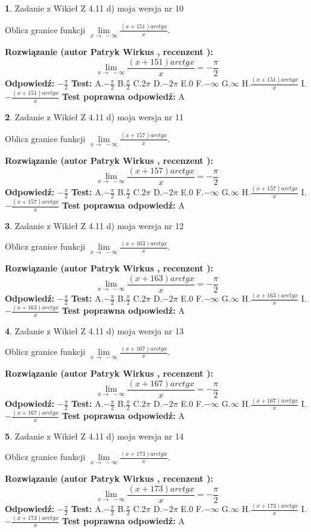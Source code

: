 \documentclass[12pt, a4paper]{article}
\theoremstyle{definition} %
\newtheorem{zad}{}
\newcommand{\zadStart}[1]{\begin{zad}#1\newline}
\newcommand{\zadStop}{\end{zad}}
\newcommand{\rozwStart}[2]{\noindent \textbf{Rozwiązanie (autor #1 , recenzent #2): }\newline}
\newcommand{\rozwStop}{\newline}
\newcommand{\odpStart}{\noindent \textbf{Odpowiedź:}\newline}
\newcommand{\odpStop}{\newline}
\newcommand{\testStart}{\noindent \textbf{Test:}\newline}
\newcommand{\testStop}{\newline}
\newcommand{\kluczStart}{\noindent \textbf{Test poprawna odpowiedź:}\newline}
\newcommand{\kluczStop}{\newline}
\begin{document}
\zadStart{Zadanie z Wikieł Z 4.11 d) moja wersja nr 10}

Oblicz granice funkcji $\lim\limits_{x\to\ -\infty}\frac{(x+151)arctgx}{x}$.
\zadStop
\rozwStart{Patryk Wirkus}{}
$$\lim\limits_{x\to\ -\infty}\frac{(x+151)arctgx}{x} = -\frac{\pi}{2}$$
\rozwStop
\odpStart
$-\frac{\pi}{2}$
\odpStop
\testStart
A.$-\frac{\pi}{2}$ B.$\frac{\pi}{2}$ C.$2\pi$ D.$-2\pi$ E.$0$ F.$-\infty$ G.$\infty$ H.$\frac{(x+151)arctgx}{x}$ I.$-\frac{(x+151)arctgx}{x}$
\testStop
\kluczStart
A
\kluczStop



\zadStart{Zadanie z Wikieł Z 4.11 d) moja wersja nr 11}

Oblicz granice funkcji $\lim\limits_{x\to\ -\infty}\frac{(x+157)arctgx}{x}$.
\zadStop
\rozwStart{Patryk Wirkus}{}
$$\lim\limits_{x\to\ -\infty}\frac{(x+157)arctgx}{x} = -\frac{\pi}{2}$$
\rozwStop
\odpStart
$-\frac{\pi}{2}$
\odpStop
\testStart
A.$-\frac{\pi}{2}$ B.$\frac{\pi}{2}$ C.$2\pi$ D.$-2\pi$ E.$0$ F.$-\infty$ G.$\infty$ H.$\frac{(x+157)arctgx}{x}$ I.$-\frac{(x+157)arctgx}{x}$
\testStop
\kluczStart
A
\kluczStop



\zadStart{Zadanie z Wikieł Z 4.11 d) moja wersja nr 12}

Oblicz granice funkcji $\lim\limits_{x\to\ -\infty}\frac{(x+163)arctgx}{x}$.
\zadStop
\rozwStart{Patryk Wirkus}{}
$$\lim\limits_{x\to\ -\infty}\frac{(x+163)arctgx}{x} = -\frac{\pi}{2}$$
\rozwStop
\odpStart
$-\frac{\pi}{2}$
\odpStop
\testStart
A.$-\frac{\pi}{2}$ B.$\frac{\pi}{2}$ C.$2\pi$ D.$-2\pi$ E.$0$ F.$-\infty$ G.$\infty$ H.$\frac{(x+163)arctgx}{x}$ I.$-\frac{(x+163)arctgx}{x}$
\testStop
\kluczStart
A
\kluczStop



\zadStart{Zadanie z Wikieł Z 4.11 d) moja wersja nr 13}

Oblicz granice funkcji $\lim\limits_{x\to\ -\infty}\frac{(x+167)arctgx}{x}$.
\zadStop
\rozwStart{Patryk Wirkus}{}
$$\lim\limits_{x\to\ -\infty}\frac{(x+167)arctgx}{x} = -\frac{\pi}{2}$$
\rozwStop
\odpStart
$-\frac{\pi}{2}$
\odpStop
\testStart
A.$-\frac{\pi}{2}$ B.$\frac{\pi}{2}$ C.$2\pi$ D.$-2\pi$ E.$0$ F.$-\infty$ G.$\infty$ H.$\frac{(x+167)arctgx}{x}$ I.$-\frac{(x+167)arctgx}{x}$
\testStop
\kluczStart
A
\kluczStop



\zadStart{Zadanie z Wikieł Z 4.11 d) moja wersja nr 14}

Oblicz granice funkcji $\lim\limits_{x\to\ -\infty}\frac{(x+173)arctgx}{x}$.
\zadStop
\rozwStart{Patryk Wirkus}{}
$$\lim\limits_{x\to\ -\infty}\frac{(x+173)arctgx}{x} = -\frac{\pi}{2}$$
\rozwStop
\odpStart
$-\frac{\pi}{2}$
\odpStop
\testStart
A.$-\frac{\pi}{2}$ B.$\frac{\pi}{2}$ C.$2\pi$ D.$-2\pi$ E.$0$ F.$-\infty$ G.$\infty$ H.$\frac{(x+173)arctgx}{x}$ I.$-\frac{(x+173)arctgx}{x}$
\testStop
\kluczStart
A
\kluczStop
\end{document}
